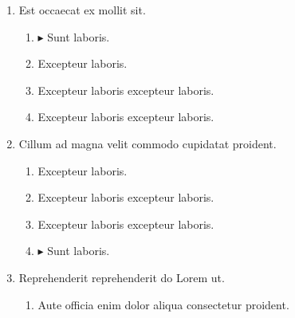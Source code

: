 \documentclass[a4paper,12pt]{article}
\begin{document}
\begin{enumerate}[label=\textbf{\arabic*.}]
\begin{multicols}{2}
\begin{enumerate}
		\item  Excepteur laboris excepteur laboris.
  
		\item  Excepteur laboris.
    
		\item  Excepteur laboris excepteur laboris.
    
	\end{enumerate}

\end{multicols}
\item Est occaecat ex mollit sit.
\begin{multicols}{2}
	\begin{enumerate}
		\item $\blacktriangleright$  Sunt laboris.
    
		\item  Excepteur laboris.
    
		\item  Excepteur laboris excepteur laboris.
    
		\item  Excepteur laboris excepteur laboris.
  
	\end{enumerate}

\end{multicols}
\item Cillum ad magna velit commodo cupidatat proident.
\begin{multicols}{2}
	\begin{enumerate}
		\item  Excepteur laboris.
    
		\item  Excepteur laboris excepteur laboris.
    
		\item  Excepteur laboris excepteur laboris.
  
		\item $\blacktriangleright$  Sunt laboris.
    
	\end{enumerate}

\end{multicols}
\item Reprehenderit reprehenderit do Lorem ut.
\begin{multicols}{2}
	\begin{enumerate}
		\item  Aute officia enim dolor aliqua consectetur proident.
    

\end{enumerate}
\end{multicols}
\end{enumerate}
\end{document}
